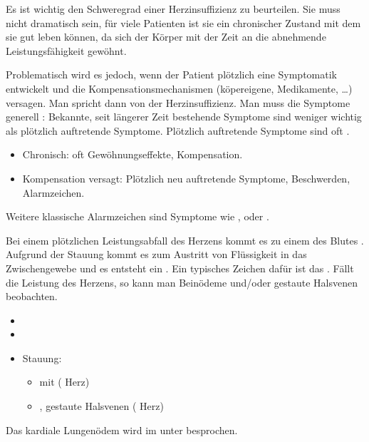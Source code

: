 {
Es ist wichtig den Schweregrad einer Herzinsuffizienz zu beurteilen. Sie
muss nicht dramatisch sein, für viele Patienten ist sie ein
chronischer Zustand mit dem sie gut leben können, da sich
der Körper mit der Zeit an die abnehmende Leistungsfähigkeit
gewöhnt.

Problematisch wird es jedoch, wenn der Patient plötzlich
eine Symptomatik entwickelt und die Kompensationsmechanismen (köpereigene, Medikamente, {\dots})
versagen. Man spricht dann von der 
Herzinsuffizienz. Man muss die Symptome generell : Bekannte, seit längerer Zeit bestehende
Symptome sind weniger wichtig als plötzlich auftretende
Symptome. Plötzlich auftretende Symptome sind oft . 
}{
\begin{itemize}
  \item Chronisch: oft Gewöhnungseffekte, Kompensation.
  \item Kompensation versagt: Plötzlich neu auftretende
  Symptome, Beschwerden, Alarmzeichen.
\end{itemize}
}{}{}{}


{
Weitere klassische Alarmzeichen sind Symptome wie
,  oder . 

Bei einem plötzlichen
Leistungsabfall des  Herzens kommt es zu einem
 des Blutes . Aufgrund der Stauung
kommt es zum Austritt von Flüssigkeit in das
Zwischengewebe und es entsteht ein
. Ein typisches Zeichen dafür
ist das . Fällt die Leistung des 
Herzens, so kann man Beinödeme und/oder gestaute Halsvenen
beobachten. 
}
{
\begin{itemize}
  \item {}
  \item  {}
  \item Stauung:
  \begin{itemize}
    \item {} mit  ( Herz)
    \item {}, gestaute Halsvenen (
    Herz)
  \end{itemize}
\end{itemize}
}{}{}{}


Das kardiale Lungenödem wird im unter
besprochen.

